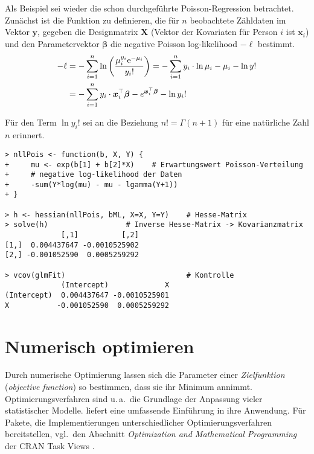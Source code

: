 Als Beispiel sei wieder die schon durchgeführte Poisson-Regression betrachtet. Zunächst ist die Funktion zu definieren, die für $n$ beobachtete Zähldaten im Vektor $\bm{y}$, gegeben die Designmatrix $\bm{X}$ (Vektor der Kovariaten für Person $i$ ist $\bm{x}_{i}$) und den Parametervektor $\bm{\beta}$ die negative Poisson log-likelihood $-\ell$ bestimmt.
\begin{align*}
-\ell &= -\sum_{i=1}^{n} \ln \left(\frac{\mu_{i}^{y_{i}} {\mathrm{e}}^{-\mu_{i}}}{y_{i}!}\right) = -\sum_{i=1}^{n} y_{i} \cdot \ln \mu_{i} - \mu_{i} - \ln y!\\
      &= -\sum_{i=1}^{n} y_{i} \cdot \bm{x}_{i}^{\top} \bm{\beta} - e^{\bm{x}_{i}^{\top} \bm{\beta}} - \ln y_{i}!
\end{align*}

Für den Term $\ln y_{i}!$ sei an die Beziehung $n! = \Gamma(n+1)$ für eine natürliche Zahl $n$ erinnert.
\begin{lstlisting}
> nllPois <- function(b, X, Y) {
+     mu <- exp(b[1] + b[2]*X)    # Erwartungswert Poisson-Verteilung
+     # negative log-likelihood der Daten
+     -sum(Y*log(mu) - mu - lgamma(Y+1))
+ }

> h <- hessian(nllPois, bML, X=X, Y=Y)    # Hesse-Matrix
> solve(h)                  # Inverse Hesse-Matrix -> Kovarianzmatrix
             [,1]          [,2]
[1,]  0.004437647 -0.0010525902
[2,] -0.001052590  0.0005259292

> vcov(glmFit)                            # Kontrolle
             (Intercept)             X
(Intercept)  0.004437647 -0.0010525901
X           -0.001052590  0.0005259292
\end{lstlisting}

\section{Numerisch optimieren}
\label{sec:optim}

Durch numerische Optimierung lassen sich die Parameter einer \emph{Zielfunktion} (\emph{objective function}) so bestimmen, dass sie ihr Minimum annimmt. Optimierungsverfahren sind u.\,a.\ die Grundlage der Anpassung vieler statistischer Modelle.  liefert eine umfassende Einführung in ihre Anwendung. Für Pakete, die Implementierungen unterschiedlicher Optimierungsverfahren bereitstellen, vgl.\ den Abschnitt \emph{Optimization and Mathematical Programming} der CRAN Task Views \cite{CRANtvOptim}.

